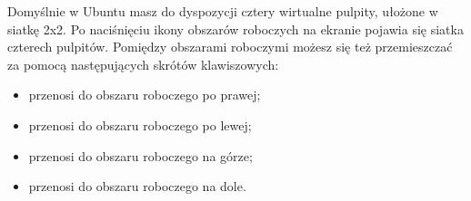 Domyślnie w Ubuntu masz do dyspozycji cztery wirtualne pulpity, ułożone w siatkę 2x2. Po naciśnięciu ikony obszarów roboczych na ekranie pojawia się siatka czterech pulpitów. Pomiędzy obszarami roboczymi możesz się też przemieszczać za pomocą następujących skrótów klawiszowych:
\begin{itemize}
\item {} przenosi do obszaru roboczego po prawej;
\item {} przenosi do obszaru roboczego po lewej;
\item {} przenosi do obszaru roboczego na górze;
\item {} przenosi do obszaru roboczego na dole.
\end{itemize}
